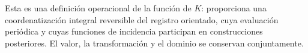 Esta es una definición operacional de la función de \(K\): proporciona
una coordenatización integral reversible del registro orientado, cuya
evaluación periódica y cuyas funciones de incidencia participan en
construcciones posteriores. El valor, la transformación y el dominio
se conservan conjuntamente.

